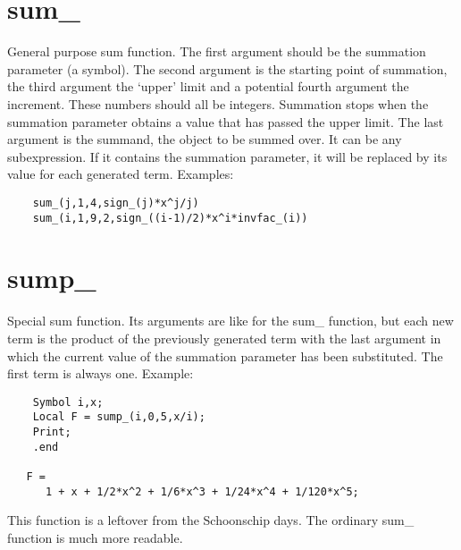 
\section{sum\_}
\label{funsum}
\noindent General purpose sum function. The first argument should 
be the summation parameter (a symbol). The second argument is the starting 
point of summation, the third argument the `upper' limit and a potential 
fourth argument the increment. These numbers should all be integers. 
Summation stops when the summation parameter obtains a value that has 
passed the upper limit. The last argument is the summand, the object to be 
summed over. It can be any subexpression. If it contains the summation 
parameter, it will be replaced by its value for each generated term. 
Examples:
\begin{verbatim}
    sum_(j,1,4,sign_(j)*x^j/j)
    sum_(i,1,9,2,sign_((i-1)/2)*x^i*invfac_(i))
\end{verbatim}


\section{sump\_}
\label{funsump}
\noindent Special sum function. Its arguments are like for the 
sum\_ function, but each new term is the product of the previously 
generated term with the last argument in which the current value of the 
summation parameter has been substituted. The first term is always one. 
Example:
\begin{verbatim}
    Symbol i,x;
    Local F = sump_(i,0,5,x/i);
    Print;
    .end

   F =
      1 + x + 1/2*x^2 + 1/6*x^3 + 1/24*x^4 + 1/120*x^5;
\end{verbatim}
This function is a leftover from the Schoonschip days. 
The ordinary sum\_ function is much more readable.


